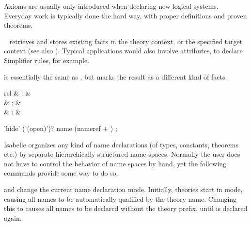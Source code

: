 \begin{isabellebody}
\begin{isamarkuptext}
\begin{descr}
  Axioms are usually only introduced when declaring new logical
  systems.  Everyday work is typically done the hard way, with proper
  definitions and proven theorems.
  
  \item [\mbox{\isa{\isacommand{lemmas}}}~\isa{{\isachardoublequote}a\ {\isacharequal}\ b\isactrlsub {\isadigit{1}}\ {\isasymdots}\ b\isactrlsub n{\isachardoublequote}}]
  retrieves and stores existing facts in the theory context, or the
  specified target context (see also ).  Typical
  applications would also involve attributes, to declare Simplifier
  rules, for example.
  
  \item [\mbox{\isa{\isacommand{theorems}}}] is essentially the same as \mbox{}, but marks the result as a different kind of facts.

  \end{descr}%
\end{isamarkuptext}%
\isamarkuptrue%
%
\isamarkuptrue%
%
\begin{isamarkuptext}%
\begin{matharray}{rcl}
    \mbox{} & : &  \\
    \mbox{} & : &  \\
    \mbox{} & : &  \\
  \end{matharray}

  \begin{rail}
    'hide' ('(open)')? name (nameref + )
    ;
  \end{rail}

  Isabelle organizes any kind of name declarations (of types,
  constants, theorems etc.) by separate hierarchically structured name
  spaces.  Normally the user does not have to control the behavior of
  name spaces by hand, yet the following commands provide some way to
  do so.

  \begin{descr}

  \item [\mbox{\isa{\isacommand{global}}} and \mbox{\isa{\isacommand{local}}}] change the
  current name declaration mode.  Initially, theories start in
  \mbox{} mode, causing all names to be automatically
  qualified by the theory name.  Changing this to \mbox{}
  causes all names to be declared without the theory prefix, until
  \mbox{} is declared again.
  

\end{descr}
\end{isamarkuptext}
\end{isabellebody}
